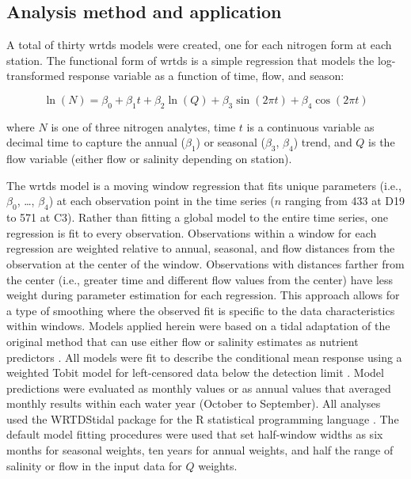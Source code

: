 \documentclass[letterpaper,12pt,oneside]{article}\usepackage[]{graphicx}\usepackage[]{color}
\begin{document}
\subsection{Analysis method and application}

A total of thirty \ac{wrtds} models were created, one for each nitrogen form at each station.  The functional form of \ac{wrtds} is a simple regression \citep{Hirsch10} that models the log-transformed response variable as a function of time, flow, and season:

\begin{equation}
\ln\left(N\right) = \beta_0 + \beta_1 t + \beta_2 \ln\left(Q\right) + \beta_3 \sin\left(2\pi t\right) + \beta_4 \cos\left(2\pi t\right)
\end{equation}  



\noindent where $N$ is one of three nitrogen analytes, time $t$ is a continuous variable as decimal time to capture the annual ($\beta_1$) or seasonal ($\beta_3$, $\beta_4$) trend, and $Q$ is the flow variable (either flow or salinity depending on station).  

The \ac{wrtds} model is a moving window regression that fits unique parameters (i.e., $\beta_0$, \ldots, $\beta_4$) at each observation point in the time series ($n$ ranging from 433 at D19 to 571 at C3).  Rather than fitting a global model to the entire time series, one regression is fit to every observation.  Observations within a window for each regression are weighted relative to annual, seasonal, and flow distances from the observation at the center of the window.  Observations with distances farther from the center (i.e., greater time and different flow values from the center) have less weight during parameter estimation for each regression.  This approach allows for a type of smoothing where the observed fit is specific to the data characteristics within windows. Models applied herein were based on a tidal adaptation of the original method that can use either flow or salinity estimates as nutrient predictors \citep{Beck15}.  All models were fit to describe the conditional mean response using a weighted Tobit model for left-censored data below the detection limit \citep{Tobin58}.  Model predictions were evaluated as monthly values or as annual values that averaged monthly results within each water year (October to September). All analyses used the WRTDStidal package for the R statistical programming language \citep{Beck17b,RDCT17}.  The default model fitting procedures were used that set half-window widths as six months for seasonal weights, ten years for annual weights, and half the range of salinity or flow in the input data for $Q$ weights.
\end{document}
